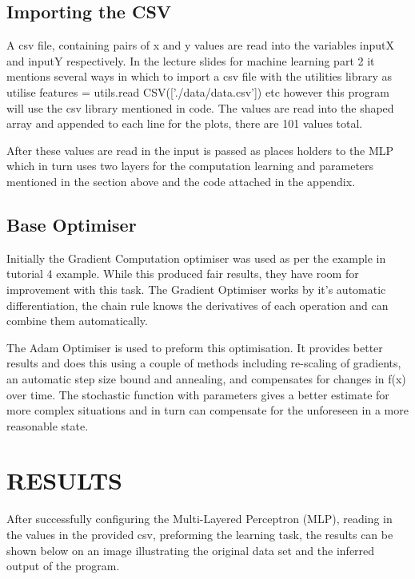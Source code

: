 \documentclass[a4paper, 10pt]{IEEEconf}
\begin{document}
\subsection{Importing the CSV}

A csv file, containing pairs of x and y values are read into the variables inputX and inputY respectively. In the lecture slides for machine learning part 2 it mentions several ways in which to import a csv file with the utilities library as utilise features = utils.read CSV(['./data/data.csv']) etc however this program will use the csv library mentioned in code. The values are read into the shaped array and appended to each line for the plots, there are 101 values total. 

After these values are read in the input is passed as places holders to the MLP which in turn uses two layers for the computation learning and parameters mentioned in the section above and the code attached in the appendix.

\subsection{Base Optimiser}

Initially the Gradient Computation optimiser was used as per the example in tutorial 4 example. While this produced fair results, they have room for improvement with this task. The Gradient Optimiser works by it's automatic differentiation, the chain rule knows the derivatives of each operation and can combine them automatically.

The Adam Optimiser is used to preform this optimisation. It provides better results and does this using a couple of methods including re-scaling of gradients, an automatic step size bound and annealing, and compensates for changes in f(x) over time. The stochastic function with parameters gives a better estimate for more complex situations and in turn can compensate for the unforeseen in a more reasonable state.


\section{RESULTS}

After successfully configuring the Multi-Layered Perceptron (MLP), reading in the values in the provided csv, preforming the learning task, the results can be shown below on an image illustrating the original data set and the inferred output of the program.
\end{document}

